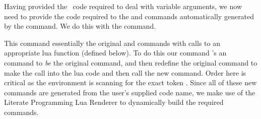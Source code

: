 \startConTest
\begingroup
\endgroup
\stopConTest

\startConTest
\begingroup
  \firstargumentfalse
  \secondargumentfalse
  \thirdargumentfalse
\endgroup
\stopConTest

\startConTest
\begingroup
\endgroup
\stopConTest

\stopTestCase


\startConTest
\begingroup
\endgroup
\stopConTest
\stopTestCase

\stopTestSuite


Having provided the \ConTeXt\ code required to deal with variable 
arguments, we now need to provide the code required to  the 
\type{\startXXX} and \type{\stopXXX} commands automatically generated by 
the  command. We do this with the \type{\fixLitProgs} 
command. 

This command essentially  the original \type{\startXXX} and 
\type{\stopXXX} commands with calls to an appropriate lua function 
(defined below). To do this our  command \type{\let}'s an 
\type{\oldXXX} command to \emph{be} the original command, and then 
redefine the original command to make the call into the lua code and then 
call the new \type{\oldXXX} command. Order here is critical as the 
 environment is scanning for the exact token \type{\stopXXX}. 
Since all of these new commands are generated from the user's supplied 
code name, we make use of the Literate Programming Lua Renderer to 
dynamically build the required commands. 

